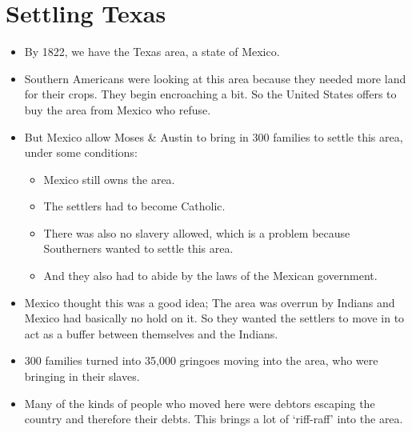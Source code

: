 \documentclass{article}
\begin{document}
\section{Settling Texas}
  \begin{itemize}
    \item By 1822, we have the Texas area, a state of Mexico.
    \item Southern Americans were looking at this area because they needed more land for their crops. They begin encroaching a bit. So the United States offers to buy the area from Mexico who refuse.
    \item But Mexico allow Moses \& Austin to bring in 300 families to settle this area, under some conditions:
      \begin{itemize}
        \item Mexico still owns the area.
        \item The settlers had to become Catholic.
        \item There was also no slavery allowed, which is a problem because Southerners wanted to settle this area.
        \item And they also had to abide by the laws of the Mexican government.
      \end{itemize}
    \item Mexico thought this was a good idea; The area was overrun by Indians and Mexico had basically no hold on it. So they wanted the settlers to move in to act as a buffer between themselves and the Indians.
    \item 300 families turned into 35,000 gringoes moving into the area, who were bringing in their slaves.
    \item Many of the kinds of people who moved here were debtors escaping the country and therefore their debts. This brings a lot of `riff-raff' into the area.
  \end{itemize}
\end{document}
